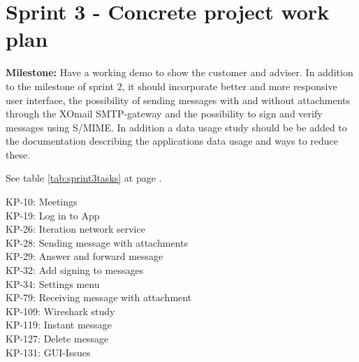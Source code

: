 \section{Sprint 3 - Concrete project work plan}

\textbf{Milestone:} Have a working demo to show the customer and adviser. In addition to the milestone of sprint 2, it should incorporate better and more responsive user interface, the possibility of sending messages with and without attachments through the XOmail SMTP-gateway and the possibility to sign and verify messages using S/MIME. In addition a data usage study should be be added to the documentation describing the applications data usage and ways to reduce these.

See table \ref{tab:sprint3tasks} at page \pageref{tab:sprint3tasks}.
\begin{table}
KP-10: Meetings\\
KP-19: Log in to App\\
KP-26: Iteration network service\\
KP-28: Sending message with attachments\\
KP-29: Answer and forward message\\
KP-32: Add signing to messages\\
KP-34: Settings menu\\
KP-79: Receiving message with attachment\\
KP-109: Wireshark study\\
KP-119: Instant message\\
KP-127: Delete message\\
KP-131: GUI-Issues\\


\end{table}
